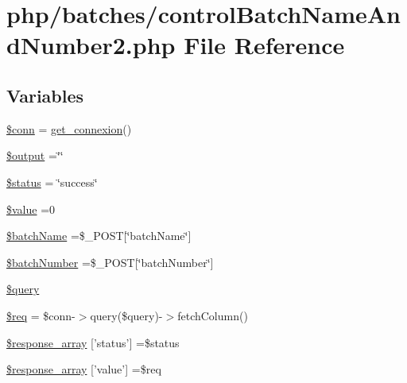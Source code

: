 \hypertarget{control_batch_name_and_number2_8php}{\section{php/batches/control\-Batch\-Name\-And\-Number2.php File Reference}
\label{control_batch_name_and_number2_8php}
}
\subsection*{Variables}
\begin{DoxyCompactItemize}
\item 
\hyperlink{control_batch_name_and_number2_8php_aa8a5a87b9c1a6a0819b88447cbe41877}{\$conn} = \hyperlink{php__functions_8php_ace18bc10f3fd08f92688ac743e0d8c2e}{get\-\_\-connexion}()
\item 
\hyperlink{control_batch_name_and_number2_8php_a73004ce9cd673c1bfafd1dc351134797}{\$output} =\char`\"{}\char`\"{}
\item 
\hyperlink{control_batch_name_and_number2_8php_a58391ea75f2d29d5d708d7050b641c33}{\$status} = \char`\"{}success\char`\"{}
\item 
\hyperlink{control_batch_name_and_number2_8php_a0f298096f322952a72a50f98a74c7b60}{\$value} =0
\item 
\hyperlink{control_batch_name_and_number2_8php_ae0139f42f02473374ecb453f87c66534}{\$batch\-Name} =\$\-\_\-\-P\-O\-S\-T\mbox{[}\char`\"{}batch\-Name\char`\"{}\mbox{]}
\item 
\hyperlink{control_batch_name_and_number2_8php_a5efc7692d3e718869a2ba3a55876129c}{\$batch\-Number} =\$\-\_\-\-P\-O\-S\-T\mbox{[}\char`\"{}batch\-Number\char`\"{}\mbox{]}
\item 
\hyperlink{control_batch_name_and_number2_8php_af59a5f7cd609e592c41dc3643efd3c98}{\$query}
\item 
\hyperlink{control_batch_name_and_number2_8php_a63a7a283ea5dee8af1e2d5a3435bf370}{\$req} = \$conn-\/$>$query(\$query)-\/$>$fetch\-Column()
\item 
\hyperlink{control_batch_name_and_number2_8php_acd0903a7a32e8397aefd0ce8b7dbd1ab}{\$response\-\_\-array} \mbox{[}'status'\mbox{]} =\$status
\item 
\hyperlink{control_batch_name_and_number2_8php_abbcbb7142adc1824bb5531445d2de0f0}{\$response\-\_\-array} \mbox{[}'value'\mbox{]} =\$req
\end{DoxyCompactItemize}


